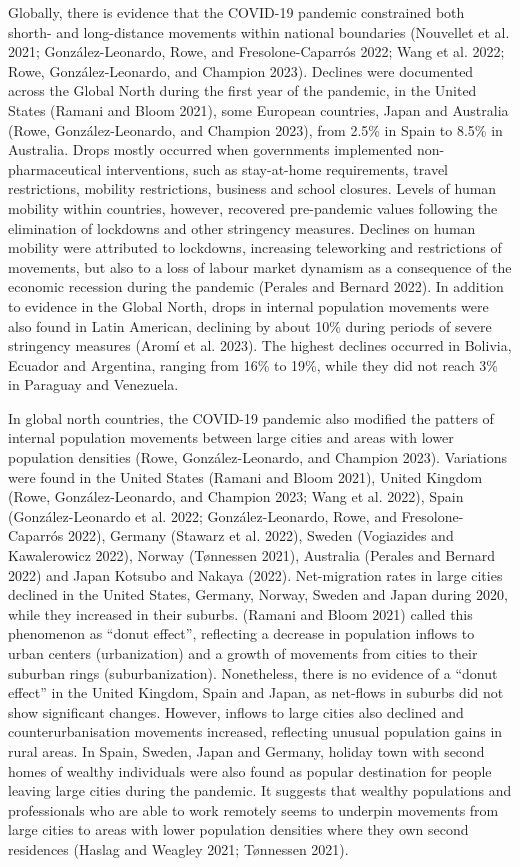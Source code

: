 \documentclass[
  10pt,
  letterpaper,
  DIV=11,
  numbers=noendperiod]{scrartcl}
\begin{document}
Globally, there is evidence that the COVID-19 pandemic constrained both
shorth- and long-distance movements within national boundaries
(Nouvellet et al. 2021; González-Leonardo, Rowe, and Fresolone-Caparrós
2022; Wang et al. 2022; Rowe, González-Leonardo, and Champion 2023).
Declines were documented across the Global North during the first year
of the pandemic, in the United States (Ramani and Bloom 2021), some
European countries, Japan and Australia (Rowe, González-Leonardo, and
Champion 2023), from 2.5\% in Spain to 8.5\% in Australia. Drops mostly
occurred when governments implemented non-pharmaceutical interventions,
such as stay-at-home requirements, travel restrictions, mobility
restrictions, business and school closures. Levels of human mobility
within countries, however, recovered pre-pandemic values following the
elimination of lockdowns and other stringency measures. Declines on
human mobility were attributed to lockdowns, increasing teleworking and
restrictions of movements, but also to a loss of labour market dynamism
as a consequence of the economic recession during the pandemic (Perales
and Bernard 2022). In addition to evidence in the Global North, drops in
internal population movements were also found in Latin American,
declining by about 10\% during periods of severe stringency measures
(Aromí et al. 2023). The highest declines occurred in Bolivia, Ecuador
and Argentina, ranging from 16\% to 19\%, while they did not reach 3\%
in Paraguay and Venezuela.

In global north countries, the COVID-19 pandemic also modified the
patters of internal population movements between large cities and areas
with lower population densities (Rowe, González-Leonardo, and Champion
2023). Variations were found in the United States (Ramani and Bloom
2021), United Kingdom (Rowe, González-Leonardo, and Champion 2023; Wang
et al. 2022), Spain (González-Leonardo et al. 2022; González-Leonardo,
Rowe, and Fresolone-Caparrós 2022), Germany (Stawarz et al. 2022),
Sweden (Vogiazides and Kawalerowicz 2022), Norway (Tønnessen 2021),
Australia (Perales and Bernard 2022) and Japan Kotsubo and Nakaya
(2022). Net-migration rates in large cities declined in the United
States, Germany, Norway, Sweden and Japan during 2020, while they
increased in their suburbs. (Ramani and Bloom 2021) called this
phenomenon as ``donut effect'', reflecting a decrease in population
inflows to urban centers (urbanization) and a growth of movements from
cities to their suburban rings (suburbanization). Nonetheless, there is
no evidence of a ``donut effect'' in the United Kingdom, Spain and
Japan, as net-flows in suburbs did not show significant changes.
However, inflows to large cities also declined and counterurbanisation
movements increased, reflecting unusual population gains in rural areas.
In Spain, Sweden, Japan and Germany, holiday town with second homes of
wealthy individuals were also found as popular destination for people
leaving large cities during the pandemic. It suggests that wealthy
populations and professionals who are able to work remotely seems to
underpin movements from large cities to areas with lower population
densities where they own second residences (Haslag and Weagley 2021;
Tønnessen 2021).
\end{document}
